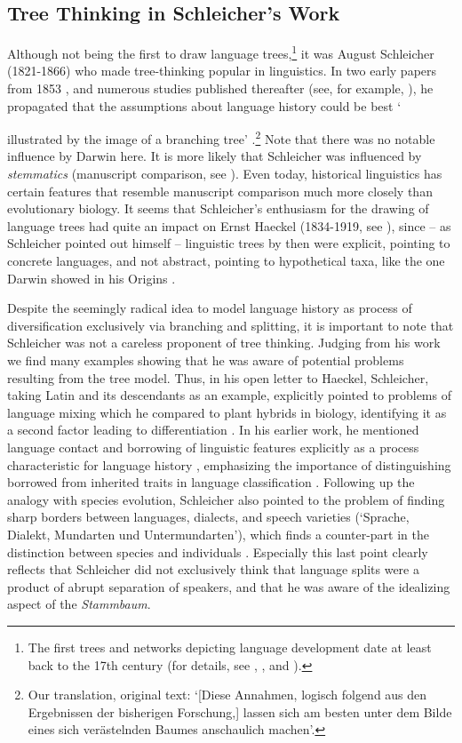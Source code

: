\documentclass[svgnames,12pt]{scrartcl}
\begin{document}
\subsection{Tree Thinking in Schleicher's Work}
Although not being the first to draw language trees,\footnote{The first trees and networks depicting
language development date at least back to the 17th century (for details, see \citealt{List2016h},
\citealt{Morrison2016}, and \citealt{Sutrop2012}).} it was August Schleicher (1821-1866) who made
tree-thinking popular in linguistics. In two early papers from 1853
\citep{Schleicher1853,Schleicher1853a}, and numerous studies published thereafter (see, for example,
\citealt{Schleicher1861,Schleicher1863}), he propagated that the assumptions about language history
could be best `{illustrated by the image of a branching tree'
\citep[787]{Schleicher1853}.\footnote{Our translation, original text: `[Diese Annahmen, logisch
folgend aus den Ergebnissen der bisherigen Forschung,] lassen sich am besten unter dem Bilde eines
sich verästelnden Baumes anschaulich machen'.} Note that there was no notable influence by Darwin
here. It is more likely that Schleicher was influenced by \emph{stemmatics} (manuscript comparison,
see \citealt[8]{Hoenigswald1963}). Even today, historical linguistics has certain features that
resemble manuscript comparison much more closely than evolutionary biology. It seems that
Schleicher's enthusiasm for the drawing of language trees had quite an impact on Ernst Haeckel
(1834-1919, see \citealt{Sutrop2012}), since – as Schleicher pointed out himself
\citep[14]{Schleicher1863} – linguistic trees by then were explicit, pointing to concrete languages,
and not abstract, pointing to hypothetical taxa, like the one
Darwin showed in his Origins \citep{Darwin1859}.
 
Despite the seemingly radical idea to model language history as process of diversification
exclusively via branching and splitting, it is important to note that Schleicher was not a careless
proponent of tree thinking. Judging from his work we find many examples showing that he was aware of
potential problems resulting from the tree model. Thus, in his open letter to Haeckel, Schleicher,
taking Latin and its descendants as an example, explicitly pointed to problems of language mixing
which he compared to plant hybrids in biology, identifying it as a second factor leading to
differentiation \citep[18]{Schleicher1863}. 
In his earlier work, he mentioned language contact and
borrowing of linguistic features explicitly as a process characteristic for language history \citep[6]{Schleicher1861}, emphasizing the importance of
distinguishing borrowed from inherited traits in language classification \citep[30]{Schleicher1848}.
Following up the analogy with species evolution, Schleicher also pointed to the problem of finding
sharp borders between languages, dialects, and speech varieties (`Sprache, Dialekt, Mundarten und
Untermundarten'), which finds a counter-part in the distinction between species and
individuals \citep[21]{Schleicher1863}. Especially this last point clearly reflects
that Schleicher did not exclusively think that
language splits were a product of abrupt separation of speakers, and that he was aware of the
idealizing aspect of the \emph{Stammbaum}.
}
\end{document}
